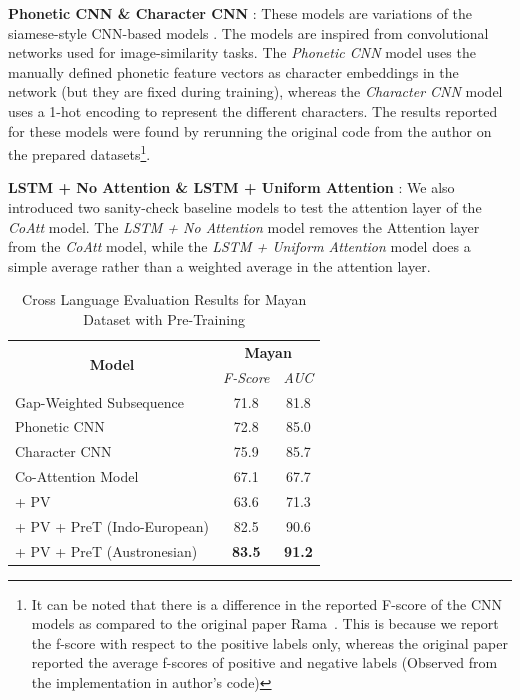 \documentclass[11pt,letterpaper]{article}
\begin{document}
\textbf{Phonetic CNN \& Character CNN} : These models are variations of the siamese-style CNN-based models \cite{rama2016siamese}. The models are inspired from convolutional networks used for image-similarity tasks. The \textit{Phonetic CNN} model uses the manually defined phonetic feature vectors as character embeddings in the network (but they are fixed during training), whereas the \textit{Character CNN} model uses a 1-hot encoding to represent the different characters. The results reported for these models were found by rerunning the original code from the  author on the prepared datasets\footnote{It can be noted that there is a difference in the reported F-score of the CNN models as compared to the original paper Rama~. This is because we report the f-score with respect to the positive labels only, whereas the original paper reported the average f-scores of positive and negative labels (Observed from the implementation in author's code)}.

\textbf{LSTM + No Attention \& LSTM + Uniform Attention} : We also introduced two sanity-check baseline models to test the attention layer of the \textit{CoAtt} model. The \textit{LSTM + No Attention} model removes the Attention layer from the \textit{CoAtt} model, while the \textit{LSTM + Uniform Attention} model does a simple average rather than a weighted average in the attention layer.

\begin{table}[htpb]
\centering
\begin{tabular}{|l|cc|}
\hline
\multicolumn{1}{|c|}{\multirow{2}{*}{\textbf{Model}}} & \multicolumn{2}{c|}{\textbf{Mayan}} \\ \cline{2-3} 
\multicolumn{1}{|c|}{}                                & \textit{F-Score}  & \textit{AUC}   \\ \hline
Gap-Weighted Subsequence                            & 71.8              & 81.8           \\
Phonetic CNN                                        & 72.8              & 85.0           \\
Character CNN                                       & 75.9              & 85.7           \\ \hline
Co-Attention Model                                  & 67.1              & 67.7           \\
\quad + PV                                          & 63.6              & 71.3           \\
\quad + PV + PreT (Indo-European)                   & 82.5              & 90.6           \\
\quad + PV + PreT (Austronesian)                    & \textbf{83.5}     & \textbf{91.2}  \\ \hline
\end{tabular}
\caption{Cross Language Evaluation Results for Mayan Dataset with Pre-Training }
\label{CL_res_2}
\end{table}
\end{document}
